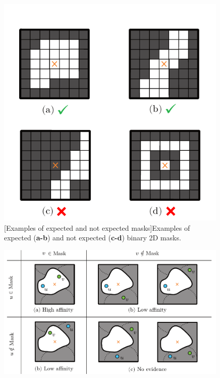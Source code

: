 \begin{figure}[t]
\centering
\begin{minipage}[t]{0.36\textwidth}
        \centering
        \includegraphics[width=0.99\textwidth]{./figures/LSIMasks/valid_masks.pdf} %
        [Examples of expected and not expected masks]{Examples of expected (\textbf{a-b}) and not expected (\textbf{c-d}) binary 2D \maskname masks. }
    \label{fig:valid_masks}
\end{minipage}\hfill
\begin{minipage}[t]{0.58\textwidth}
\centering
\includegraphics[width=0.99\textwidth]{./figures/LSIMasks/mask_cases_new.pdf} %

\end{minipage}
\end{figure}
